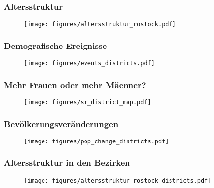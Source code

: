 \documentclass[aspectratio=169]{beamer}
\begin{document}
\begin{frame}
\frametitle{Altersstruktur}
           \begin{figure}
               \centering
                \vspace{-10pt}
               \texttt{[image: figures/altersstruktur\_rostock.pdf]}
           \end{figure}
\end{frame}

\begin{frame}
\frametitle{Demografische Ereignisse}
\begin{figure}
        \vspace{-10pt}
        \centering
       \texttt{[image: figures/events\_districts.pdf]}
   \end{figure}
\end{frame}


\begin{frame}
\frametitle{Mehr Frauen oder mehr M\"aenner?}
    \begin{figure}
    \vspace{-10pt}
       \texttt{[image: figures/sr\_district\_map.pdf]}
   \end{figure}
\end{frame}


\begin{frame}
    \frametitle{Bevölkerungsveränderungen}
           \begin{figure}
               \centering
               \vspace{-10pt}
               \texttt{[image: figures/pop\_change\_districts.pdf]}
           \end{figure}
\end{frame}

\begin{frame}
    \frametitle{Altersstruktur in den Bezirken}
           \begin{figure}
               \centering
               \vspace{-10pt}
               \texttt{[image: figures/altersstruktur\_rostock\_districts.pdf]}
           \end{figure}
\end{frame}
\end{document}
